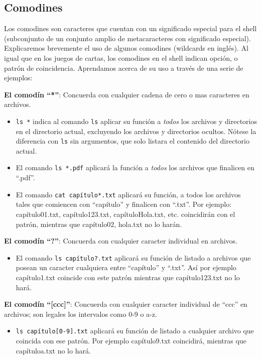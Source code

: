 \documentclass[12pt]{article}
\begin{document}
\subsection{Comodines}
Los comodines son caracteres que cuentan con un significado especial para el shell (subconjunto de un conjunto 
amplio de metacaracteres con significado especial). 
Explicaremos brevemente el uso de algunos comodines (wildcards en inglés). 
Al igual que en los juegos de cartas, los comodines en el shell indican opción, o patrón de coincidencia. 
Aprendamos acerca de su uso a través de una serie de ejemplos: 

\textbf{El comodín ``*''}:
Concuerda con cualquier cadena de cero o mas caracteres en archivos. 
\begin{itemize}
\item \texttt{ls *} indica al comando \texttt{ls} aplicar su función a \textit{todos} los archivos y 
directorios en el directorio actual, excluyendo los archivos y directorios ocultos. Nótese la diferencia
con \texttt{ls} sin argumentos, que solo listara el contenido del directorio actual. 
\item El comando \texttt{ls *.pdf} aplicará la función a \textit{todos} los archivos que finalicen en ``.pdf''. 
\item El comando \texttt{cat capítulo*.txt} aplicará su función, a todos los archivos tales que comiencen con 
``capítulo'' y finalicen con ``.txt''. Por ejemplo: capítulo01.txt, capítulo123.txt, capítuloHola.txt, etc. coincidirán con el 
patrón, mientras que capítulo02, hola.txt no lo harán.  
\end{itemize} 

\textbf{El comodín ``?''}:
Concuerda con cualquier caracter individual en archivos. 
\begin{itemize}
\item El comando \texttt{ls capítulo?.txt} aplicará su función de listado a archivos que posean un caracter
cualquiera entre ``capítulo'' y ``.txt''. Así por ejemplo capítulo1.txt coincide con este patrón mientras que 
capítulo123.txt no lo hará. 
\end{itemize} 

\textbf{El comodín ``[ccc]''}:
Concuerda con cualquier caracter individual de ``ccc'' en archivos; son legales los intervalos como 
0-9 o a-z. 
\begin{itemize}
\item \texttt{ls capítulo[0-9].txt} aplicará su función de listado a cualquier archivo que coincida 
con ese patrón. Por ejemplo capítulo9.txt coincidirá, mientras que capítuloa.txt no lo hará. 
\end{itemize} 
\end{document}
